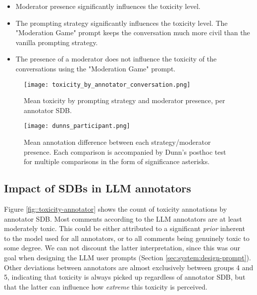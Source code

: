 \begin{itemize}
	\item Moderator presence significantly influences the toxicity level.
	
	\item The prompting strategy significantly influences the toxicity level. The "Moderation Game" prompt keeps the conversation much more civil than the vanilla prompting strategy.
	
	\item The presence of a moderator does not influence the toxicity of the conversations using the "Moderation Game" prompt.
\end{itemize}

\begin{figure}
	\centering
	\texttt{[image: toxicity\_by\_annotator\_conversation.png]}
	\caption{Mean toxicity by prompting strategy and moderator presence, per annotator SDB.}
	\label{fig::toxicity-strategy}
\end{figure}

\begin{figure}
	\centering
	\texttt{[image: dunns\_participant.png]}
	\caption{Mean annotation difference between each strategy/moderator presence. Each comparison is accompanied by Dunn's posthoc test for multiple comparisons in the form of significance asterisks.}
	\label{fig::toxicity-strategy-significance}
\end{figure}



\subsection{Impact of SDBs in LLM annotators}
\label{ssec:evaluation:annotators}

Figure \ref{fig::toxicity-annotator} shows the count of toxicity annotations by annotator SDB. Most comments according to the LLM annotators are at least moderately toxic. This could be either attributed to a significant \textit{prior} inherent to the model used for all annotators, or to all comments being genuinely toxic to some degree. We can not discount the latter interpretation, since this was our goal when designing the LLM user prompts (Section \ref{sec:system:design-prompt}). Other deviations between annotators are almost exclusively between groups 4 and 5, indicating that toxicity is always picked up regardless of annotator SDB, but that the latter can influence how \textit{extreme} this toxicity is perceived.

